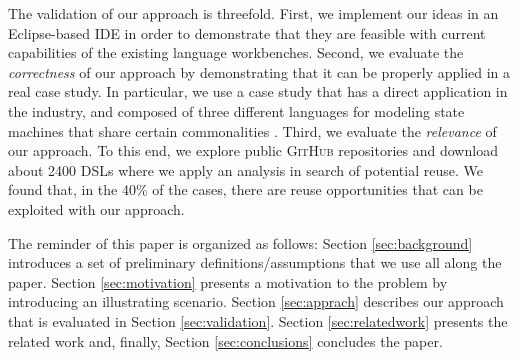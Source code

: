 The validation of our approach is threefold. First, we implement our ideas in an Eclipse-based IDE in order to demonstrate that they are feasible with current capabilities of the existing language workbenches. Second, we evaluate the \textit{correctness} of our approach by demonstrating that it can be properly applied in a real case study. In particular, we use a case study that has a direct application in the industry, and composed of three different languages for modeling state machines that share certain commonalities \cite{Crane:2007}. Third, we evaluate the \textit{relevance} of our approach. To this end, we explore public \textsc{GitHub} repositories and download about 2400 DSLs where we apply an analysis in search of potential reuse. We found that, in the 40\% of the cases, there are reuse opportunities that can be exploited with our approach. %


The reminder of this paper is organized as follows: Section \ref{sec:background} introduces a set of preliminary definitions/assumptions that we use all along the paper. Section \ref{sec:motivation} presents a motivation to the problem by introducing an illustrating scenario. Section \ref{sec:apprach} describes our approach that is evaluated in Section \ref{sec:validation}. Section \ref{sec:relatedwork} presents the related work and, finally, Section \ref{sec:conclusions} concludes the paper. 


